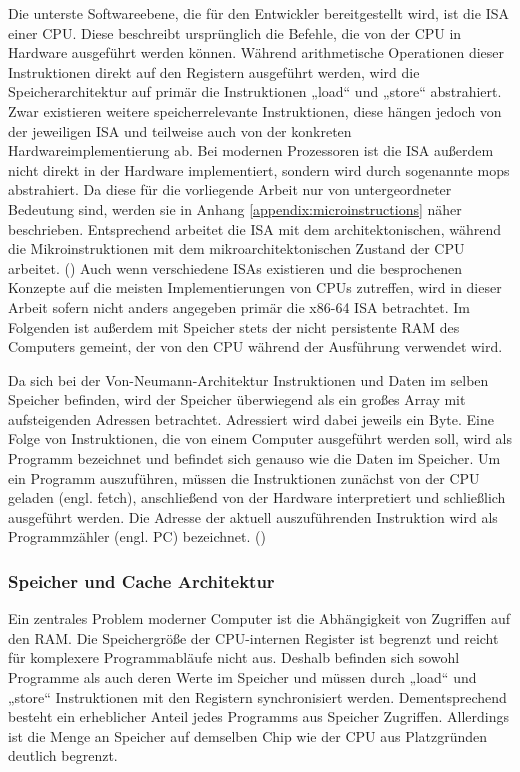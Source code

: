 Die unterste Softwareebene, die für den Entwickler bereitgestellt
wird, ist die \ac{ISA} einer \ac{CPU}. Diese beschreibt ursprünglich
die Befehle, die von der \ac{CPU} in Hardware ausgeführt werden
können. Während arithmetische Operationen dieser Instruktionen
direkt auf den Registern ausgeführt werden, wird die
Speicherarchitektur auf primär die Instruktionen „load“ und
„store“ abstrahiert. Zwar existieren weitere speicherrelevante
Instruktionen, diese hängen jedoch von der jeweiligen \ac{ISA}
und teilweise auch von der konkreten Hardwareimplementierung ab.
Bei modernen Prozessoren ist die \ac{ISA} außerdem nicht direkt
in der Hardware implementiert, sondern wird durch sogenannte
\acp{mop} abstrahiert. Da diese für die vorliegende
Arbeit nur von untergeordneter Bedeutung sind, werden sie in
Anhang \ref{appendix:microinstructions} näher
beschrieben. Entsprechend arbeitet die \ac{ISA} mit dem
architektonischen, während die Mikroinstruktionen mit dem
mikroarchitektonischen Zustand der \ac{CPU} arbeitet.
(\cite[19, 373, 379]{sarangi_basic_2021})
Auch wenn verschiedene \acp{ISA} existieren und die besprochenen
Konzepte auf die meisten Implementierungen von \acp{CPU}
zutreffen, wird in dieser Arbeit \textendash\space sofern nicht
anders angegeben \textendash\space primär die x86-64 \ac{ISA}
betrachtet. Im Folgenden ist außerdem mit Speicher stets der
nicht persistente \ac{RAM} des Computers gemeint, der von den
\ac{CPU} während der Ausführung verwendet wird.

Da sich bei der Von-Neumann-Architektur Instruktionen und Daten
im selben Speicher befinden, wird der Speicher überwiegend als
ein großes Array mit aufsteigenden Adressen betrachtet.
Adressiert wird dabei jeweils ein Byte. Eine Folge von Instruktionen,
die von einem Computer ausgeführt werden soll,
wird als Programm bezeichnet und befindet sich genauso wie die
Daten im Speicher.
Um ein Programm auszuführen, müssen die Instruktionen zunächst
von der \ac{CPU} geladen (engl. fetch), anschließend von der Hardware
interpretiert und schließlich ausgeführt werden.
Die Adresse der aktuell
auszuführenden Instruktion wird als Programmzähler
(engl. \acf{PC}) bezeichnet.
(\cite[74,188]{mandl_grundkurs_2020})

\subsubsection{Speicher und Cache Architektur}
Ein zentrales Problem moderner Computer ist die Abhängigkeit von
Zugriffen auf den \ac{RAM}. Die Speichergröße der \ac{CPU}-internen
Register ist begrenzt und reicht für komplexere Programmabläufe
nicht aus.
Deshalb befinden sich sowohl Programme als auch deren Werte
im Speicher und müssen durch „load“ und „store“ Instruktionen mit
den Registern synchronisiert werden. Dementsprechend besteht ein
erheblicher Anteil jedes Programms aus Speicher Zugriffen.
Allerdings ist die Menge an Speicher auf demselben Chip wie
der \ac{CPU} aus Platzgründen deutlich begrenzt.

